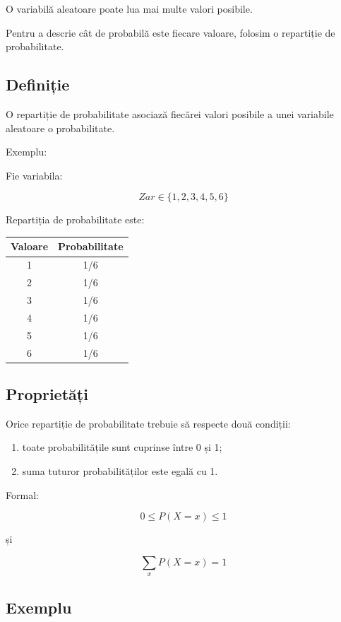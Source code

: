 \documentclass[12pt,a4paper]{article}
\begin{document}
O variabilă aleatoare poate lua mai multe valori posibile.

Pentru a descrie cât de probabilă este fiecare valoare, folosim o repartiție de probabilitate.

\subsection{Definiție}

O repartiție de probabilitate asociază fiecărei valori posibile a unei variabile aleatoare o probabilitate.

Exemplu:

Fie variabila:

\[
Zar \in \{1,2,3,4,5,6\}
\]

Repartiția de probabilitate este:

\begin{center}
\begin{tabular}{|c|c|}
\hline
Valoare & Probabilitate \\
\hline
1 & 1/6 \\
2 & 1/6 \\
3 & 1/6 \\
4 & 1/6 \\
5 & 1/6 \\
6 & 1/6 \\
\hline
\end{tabular}
\end{center}

\subsection{Proprietăți}

Orice repartiție de probabilitate trebuie să respecte două condiții:

\begin{enumerate}
\item toate probabilitățile sunt cuprinse între 0 și 1;
\item suma tuturor probabilităților este egală cu 1.
\end{enumerate}

Formal:

\[
0 \le P(X=x) \le 1
\]

și

\[
\sum_x P(X=x)=1
\]

\subsection{Exemplu}
\end{document}
